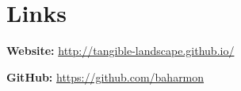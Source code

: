 \documentclass[]{baharmon_cv}
\begin{document}
\section{Links} 
\begin{minipage}{0.45\textwidth} 
\textbf{Website:} \href{http://tangible-landscape.github.io/}{http://tangible-landscape.github.io/} %
\end{minipage} 
\begin{minipage}{0.45\textwidth} 
\textbf{GitHub:} \href{https://github.com/baharmon}{https://github.com/baharmon} 
\end{minipage} 
\end{document}
